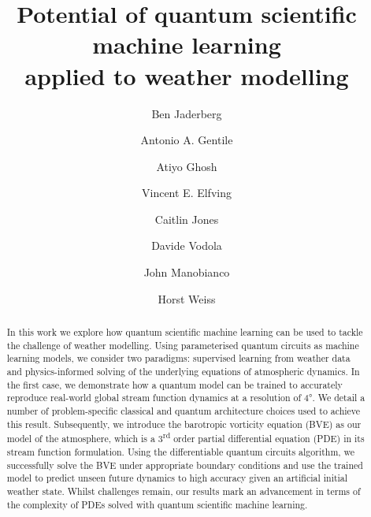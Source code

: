 \documentclass[aps,pra,a4paper,twocolumn,longbibliography,groupedaddress]{revtex4-2}
\begin{document}


\title{
Potential of quantum scientific machine learning \\ applied to weather modelling}

\author{Ben Jaderberg}
\author{Antonio A. Gentile}
\author{Atiyo Ghosh}
\author{Vincent E. Elfving}

\author{Caitlin Jones}
\author{Davide Vodola}
\author{John Manobianco}
\author{Horst Weiss}



\begin{abstract}

In this work we explore how quantum scientific machine learning can be used to tackle the challenge of weather modelling. Using parameterised quantum circuits as machine learning models, we consider two paradigms: supervised learning from weather data and physics-informed solving of the underlying equations of atmospheric dynamics. In the first case, we demonstrate how a quantum model can be trained to accurately reproduce real-world global stream function dynamics at a resolution of 4°. We detail a number of problem-specific classical and quantum architecture choices used to achieve this result. Subsequently, we introduce the barotropic vorticity equation (BVE) as our model of the atmosphere, which is a 3\textsuperscript{rd} order partial differential equation (PDE) in its stream function formulation. Using the differentiable quantum circuits algorithm, we successfully solve the BVE under appropriate boundary conditions and use the trained model to predict unseen future dynamics to high accuracy given an artificial initial weather state. 
{Whilst challenges remain, our results mark an advancement in terms of the complexity of PDEs solved with quantum scientific machine learning.
}
\end{abstract}

\maketitle
\end{document}
